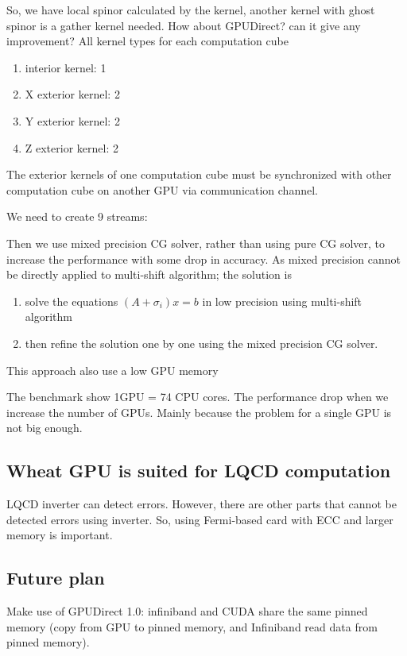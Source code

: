 So, we have local spinor calculated by the kernel, another kernel with
ghost spinor is a gather kernel needed.  How about GPUDirect? can it
give any improvement? All kernel types for each computation cube
\begin{enumerate}
\item interior kernel: 1
\item X exterior kernel: 2
\item Y exterior kernel: 2
\item Z exterior kernel: 2
\end{enumerate}
The exterior kernels of one computation cube must be synchronized with
other computation cube on another GPU via communication channel.

We need to create 9 streams:



Then we use mixed precision CG solver, rather than using pure CG
solver, to increase the performance with some drop in accuracy. As
mixed precision cannot be directly applied to multi-shift algorithm;
the solution is
\begin{enumerate}
\item solve the equations $(A+\sigma_i)x=b$ in low precision using
  multi-shift algorithm
\item then refine the solution one by one using the mixed precision CG
  solver. 
\end{enumerate}
This approach also use a low GPU memory 


The benchmark show 1GPU = 74 CPU cores. The performance drop when we
increase the number of GPUs. Mainly because the problem for a single
GPU is not big enough. 

\subsection{Wheat GPU is suited for LQCD computation}
\label{sec:wheat-gpu-suited}

LQCD inverter can detect errors. However, there are other parts that
cannot be detected errors using inverter. So, using Fermi-based card
with ECC and larger memory is important.

\subsection{Future plan}
\label{sec:future-plan}

Make use of GPUDirect 1.0: infiniband and CUDA share the same pinned
memory (copy from GPU to pinned memory, and Infiniband read data from
pinned memory).

